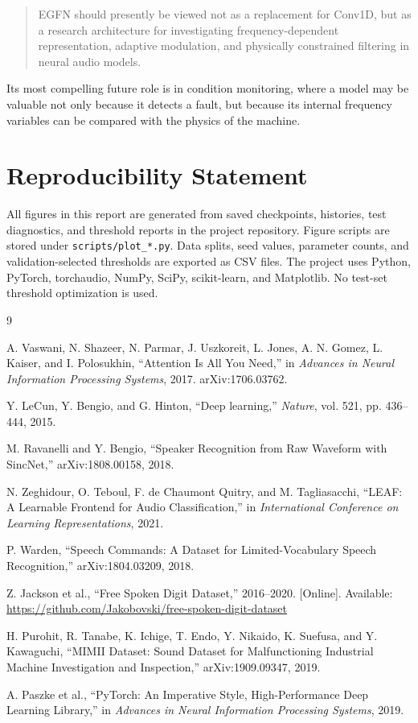 \documentclass[10pt,twocolumn]{article}
\newcommand{\egfn}{EGFN}
\begin{document}
\begin{quote}
\egfn{} should presently be viewed not as a replacement for Conv1D, but as a
research architecture for investigating frequency-dependent representation,
adaptive modulation, and physically constrained filtering in neural audio
models.
\end{quote}

Its most compelling future role is in condition monitoring, where a model may
be valuable not only because it detects a fault, but because its internal
frequency variables can be compared with the physics of the machine.

\section*{Reproducibility Statement}

All figures in this report are generated from saved checkpoints, histories,
test diagnostics, and threshold reports in the project repository. Figure
scripts are stored under \texttt{scripts/plot\_*.py}. Data splits, seed values,
parameter counts, and validation-selected thresholds are exported as CSV files.
The project uses Python, PyTorch, torchaudio, NumPy, SciPy, scikit-learn, and
Matplotlib. No test-set threshold optimization is used.

\balance
\begin{thebibliography}{9}

A. Vaswani, N. Shazeer, N. Parmar, J. Uszkoreit, L. Jones, A. N. Gomez,
L. Kaiser, and I. Polosukhin,
``Attention Is All You Need,'' in \emph{Advances in Neural Information
Processing Systems}, 2017. arXiv:1706.03762.

Y. LeCun, Y. Bengio, and G. Hinton,
``Deep learning,'' \emph{Nature}, vol. 521, pp. 436--444, 2015.

M. Ravanelli and Y. Bengio,
``Speaker Recognition from Raw Waveform with SincNet,''
arXiv:1808.00158, 2018.

N. Zeghidour, O. Teboul, F. de Chaumont Quitry, and M. Tagliasacchi,
``LEAF: A Learnable Frontend for Audio Classification,''
in \emph{International Conference on Learning Representations}, 2021.

P. Warden,
``Speech Commands: A Dataset for Limited-Vocabulary Speech Recognition,''
arXiv:1804.03209, 2018.

Z. Jackson et al.,
``Free Spoken Digit Dataset,'' 2016--2020. [Online]. Available:
\url{https://github.com/Jakobovski/free-spoken-digit-dataset}

H. Purohit, R. Tanabe, K. Ichige, T. Endo, Y. Nikaido, K. Suefusa, and
Y. Kawaguchi,
``MIMII Dataset: Sound Dataset for Malfunctioning Industrial Machine
Investigation and Inspection,'' arXiv:1909.09347, 2019.

A. Paszke et al.,
``PyTorch: An Imperative Style, High-Performance Deep Learning Library,''
in \emph{Advances in Neural Information Processing Systems}, 2019.

\end{thebibliography}
\end{document}

